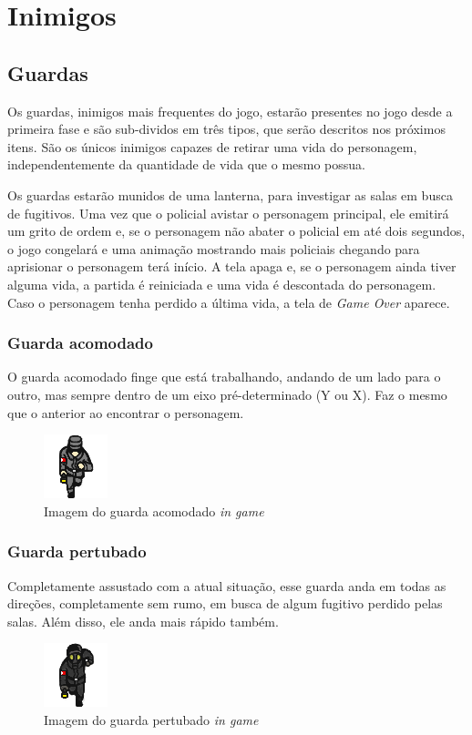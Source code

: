 \section{Inimigos}
\subsection{Guardas}

Os guardas, inimigos mais frequentes do jogo, estarão presentes no jogo desde a primeira fase e são sub-dividos em três tipos, que serão descritos nos próximos itens. São os únicos inimigos capazes de retirar uma vida do personagem, independentemente da quantidade de vida que o mesmo possua.

Os guardas estarão munidos de uma lanterna, para investigar as salas em busca de fugitivos. Uma vez que o policial avistar o personagem principal, ele emitirá um grito de ordem e, se o personagem não abater o policial em até dois segundos, o jogo congelará e uma animação mostrando mais policiais chegando para aprisionar o personagem terá início. A tela apaga e, se o personagem ainda tiver alguma vida, a partida é reiniciada e uma vida é descontada do personagem. Caso o personagem tenha perdido a última vida, a tela de \textit{Game Over} aparece.

\subsubsection*{Guarda acomodado}

O guarda acomodado finge que está trabalhando, andando de um lado para o outro, mas sempre dentro de um eixo pré-determinado (Y ou X). Faz o mesmo que o anterior ao encontrar o personagem.
\begin{figure}[h]
    \centering
    \caption{Imagem do guarda acomodado \textit{in game}}
     \includegraphics[keepaspectratio=true,scale=4]{images/guarda2.png}
\end{figure}

\subsubsection*{Guarda pertubado}

Completamente assustado com a atual situação, esse guarda anda em todas as direções, completamente sem rumo, em busca de algum fugitivo perdido pelas salas. Além disso, ele anda mais rápido também.
\begin{figure}[h]
    \centering
    \caption{Imagem do guarda pertubado \textit{in game}}
     \includegraphics[keepaspectratio=true,scale=4]{images/guarda3.png}
\end{figure}

